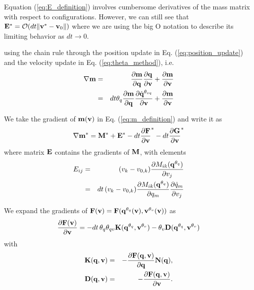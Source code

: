 Equation (\ref{eq:E_definition}) involves cumbersome derivatives of the mass matrix with respect to configurations. However, we can still see that ${\mathbf{E}}^*=\mathcal{O}(dt\Vert{\mathbf{v}}^*-{\mathbf{v}}_0\Vert)$ where we are using the big O notation to describe its limiting behavior as $dt\rightarrow 0$.


using the chain rule
through the position update in Eq. (\ref{eq:position_update}) and the velocity
update in Eq. (\ref{eq:theta_method}), i.e.
\begin{eqnarray}
	\nabla{\mathbf{m}} &=& \frac{\partial{\mathbf{m}}}{\partial{\mathbf{q}}}\frac{\partial{\mathbf{q}}}{\partial{\mathbf{v}}} + \frac{\partial{\mathbf{m}}}{\partial{\mathbf{v}}}\nonumber\\
	&=& dt\theta_q\frac{\partial{\mathbf{m}}}{\partial{\mathbf{q}}}\frac{\partial\dot{{\mathbf{q}}}^{\theta_{vq}}}{\partial{\mathbf{v}}} + \frac{\partial{\mathbf{m}}}{\partial{\mathbf{v}}}
\end{eqnarray}

We take the gradient of ${\mathbf{m}}({\mathbf{v}})$ in Eq. (\ref{eq:m_definition})
and write it as
\begin{eqnarray}
	\nabla{\mathbf{m}}^* = 
	{\mathbf{M}}^* + {\mathbf{E}}^* -
	dt\frac{\partial{\mathbf{F}}}{\partial{\mathbf{v}}}^* -
	dt\frac{\partial{\mathbf{G}}}{\partial{\mathbf{v}}}^*
\end{eqnarray}
where matrix ${\mathbf{E}}$ contains the gradients of ${\mathbf{M}}$, with elements
\begin{eqnarray}
	E_{ij} &= &
	(v_k-v_{0,k}) 
	\frac{\partial M_{ik}({\mathbf{q}}^{\theta_q})}{\partial v_j}\nonumber\\
	&=&dt\,(v_k-v_{0,k}) 
	\frac{\partial M_{ik}({\mathbf{q}}^{\theta_q})}{\partial
	q_m}\frac{\partial\dot{q}_m}{\partial v_j}
\end{eqnarray}

We expand the gradients of ${\mathbf{F}}({\mathbf{v}})={\mathbf{F}}({\mathbf{q}}^{\theta_{q}}({\mathbf{v}}), {\mathbf{v}}^{\theta_v}({\mathbf{v}}))$ as
\begin{eqnarray}
	\frac{\partial{\mathbf{F}}({\mathbf{v}})}{\partial{\mathbf{v}}} =
	-dt\,\theta_q\theta_{qv}{\mathbf{K}}({\mathbf{q}}^{\theta_q}, {\mathbf{v}}^{\theta_v})-\theta_v{\mathbf{D}}({\mathbf{q}}^{\theta_q}, {\mathbf{v}}^{\theta_v})
\end{eqnarray}
with 
\begin{eqnarray}
	\mf{K}(\mf{q}, \mf{v})&=&-\frac{\partial \mf{F}(\mf{q}, \mf{v})}{\partial \mf{q}}\mf{N}(\mf{q}),\\
	\mf{D}(\mf{q}, \mf{v})&=&-\frac{\partial \mf{F}(\mf{q}, \mf{v})}{\partial \mf{v}}.
	\label{eq:dissipation_matrix}
\end{eqnarray}

